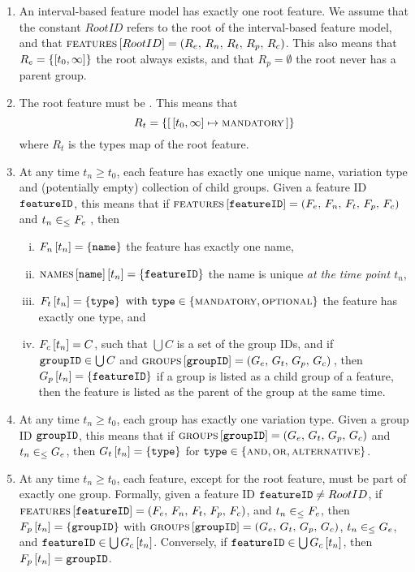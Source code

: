 \begin{enumerate}[\wf{\arabic*}, itemsep=0mm]
   \item An interval-based feature model has exactly one root feature. We assume that the constant $RootID$ refers to the root of the interval-based feature model, and that $\textsc{features} \left[ RootID \right] = \left(R_e,\, R_n,\, R_t,\, R_p,\, R_c\right)$. This also means that $R_e=\set{\interval{t_0}{\forever}}$ \textemdash{} the root always exists, and that $R_p = \emptyset$ \textemdash{} the root never has a parent group.
   \item The root feature must be \mandatory{}. This means that $$R_t  = \set{\intervalmapping{t_0}{\forever}{\mandatory}}$$ where $R_t$ is the types map of the root feature. 
\item At any time $t_n \geq t_0$, each feature has exactly one unique name, variation type and (potentially empty) collection of child groups. Given a feature ID $\texttt{featureID}$, this means that if $\textsc{features} \left[ \texttt{featureID} \right] = \left(F_e,\, F_n,\, F_t,\, F_p,\, F_c\right)$ and $t_n \in_\leq F_e$ , then
   \begin{enumerate}[(i)]
      \item $F_n \left[ t_n \right] = \left\{\texttt{name}\right\}$ \textemdash{} the feature has exactly one name,
      \item $\textsc{names} \left[ \texttt{name} \right] \left[ t_n \right] = \left\{\texttt{featureID}\right\}$ \textemdash{} the name is unique \emph{at the time point $t_n$},
      \item $F_t \left[ t_n \right] = \left\{\texttt{type}\right\} \text{ with } \texttt{type} \in \left\{\textsc{mandatory}, \textsc{optional}\right\}$ \textemdash{} the feature has exactly one type, and
      \item $F_c \left[ t_n \right] = C$, such that $\bigcup C$ is a set of the group IDs, and if $\texttt{groupID} \in \bigcup C$ and $\textsc{groups}{} \left[ \texttt{groupID} \right] = \left(G_e,\, G_t,\, G_p,\, G_c\right){}$, then $G_p \left[ t_n \right] = \left\{\texttt{featureID}\right\}$ \textemdash{} if a group is listed as a child group of a feature, then the feature is listed as the parent of the group at the same time.
   \end{enumerate}
   \item At any time $t_n \geq t_0$, each group has exactly one variation type. Given a group ID $\texttt{groupID}$, this means that if $\textsc{groups}{} \left[ \texttt{groupID} \right] = \left(G_e,\, G_t,\, G_p,\, G_c\right)$ and $t_n \in_\leq G_e$, then $G_t \left[ t_n \right] = \left\{\texttt{type}\right\}$ for $\texttt{type} \in \left\{\textsc{and}, \textsc{or}, \textsc{alternative}\right\}$.
   \item At any time $t_n \geq t_0$, each feature, except for the root feature, must be part of exactly one group. Formally, given a feature ID $\texttt{featureID} \neq RootID$, if $\textsc{features} \left[ \texttt{featureID} \right] = \left(F_e,\, F_n,\, F_t,\, F_p,\, F_c\right)$, and $t_n \in_\leq F_e$, then $F_p \left[ t_n \right] = \left\{\texttt{groupID}\right\}$ with $\textsc{groups}{} \left[ \texttt{groupID} \right] = \left(G_e,\, G_t,\, G_p,\, G_c\right)$, $t_n \in_\leq G_e$, and $\texttt{featureID} \in \bigcup G_c \left[ t_n \right]$. Conversely, if $\texttt{featureID} \in \bigcup G_c \left[ t_n \right]$, then $F_p \left[ t_n \right] = \texttt{groupID}$.

\end{enumerate}
